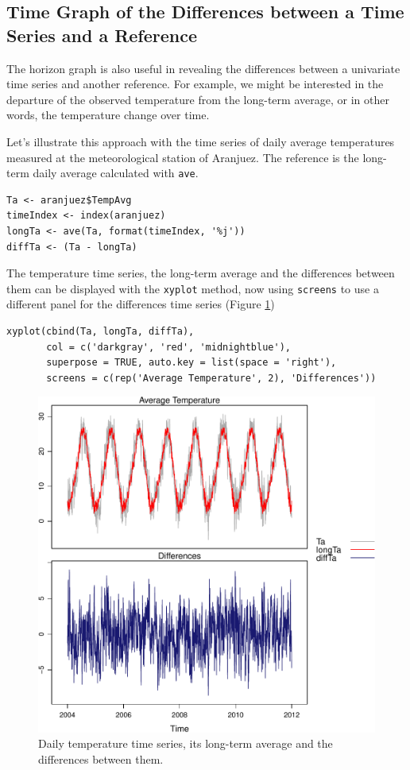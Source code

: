 \subsection{Time Graph of the Differences between a Time Series and a Reference \label{sec:differences}}
\label{sec:org19174be}

The horizon graph is also useful in revealing the differences between
a univariate time series and another reference. For example, we
might be interested in the departure of the observed temperature
from the long-term average, or in other words, the temperature
change over time.

Let's illustrate this approach with the time series of daily
average temperatures measured at the meteorological station of
Aranjuez. The reference is the long-term daily average calculated
with \texttt{ave}.

\lstset{language=r,label= ,caption= ,captionpos=b,numbers=none}
\begin{lstlisting}
Ta <- aranjuez$TempAvg
timeIndex <- index(aranjuez)
longTa <- ave(Ta, format(timeIndex, '%j'))
diffTa <- (Ta - longTa)
\end{lstlisting}


The temperature time series, the long-term average and the
differences between them can be displayed with the \texttt{xyplot}
method, now using \texttt{screens} to use a different panel for the
differences time series (Figure \ref{fig:diffTa_xyplot})
\lstset{language=r,label= ,caption= ,captionpos=b,numbers=none}
\begin{lstlisting}
xyplot(cbind(Ta, longTa, diffTa),
       col = c('darkgray', 'red', 'midnightblue'),
       superpose = TRUE, auto.key = list(space = 'right'),
       screens = c(rep('Average Temperature', 2), 'Differences'))
\end{lstlisting}

\begin{figure}[htbp]
\centering
\includegraphics[width=.9\linewidth]{figs/diffTa_xyplot.pdf}
\caption{Daily temperature time series, its long-term average and the differences between them. \label{fig:diffTa_xyplot}}
\end{figure}

